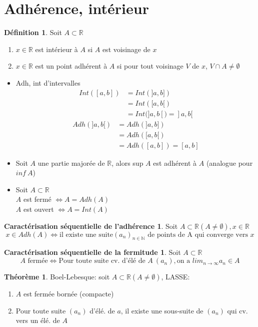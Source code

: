 \documentclass[fleqn]{article}
\theoremstyle{definition} \newtheorem*{defi}{D\'efinition}
\theoremstyle{definition} \newtheorem*{theo}{Th\'eor\`eme}
\theoremstyle{definition} \newtheorem*{adh}{Caract\'erisation s\'equentielle de l'adh\'erence}
\theoremstyle{definition} \newtheorem*{fermitude}{Caract\'erisation s\'equentielle de la fermitude}
\begin{document}
\section{Adh\'erence, int\'erieur}
\begin{defi}
	Soit $A \subset \mathbb{R}$
	\begin{enumerate}
		\item $x \in \mathbb{R}$ est int\'erieur \`a $A$ si $A$ est voisinage de $x$
		\item $x \in \mathbb{R}$ est un point adh\'erent \`a $A$ si pour tout voisinage $V$ de $x$, $V \cap A \neq \emptyset$ \\
	\end{enumerate}
\end{defi}
\begin{itemize}
	\item Adh, int d'intervalles
		\begin{align*}
			Int([a,b]) &= Int(]a,b]) \\
					   &= Int([a,b[) \\
					   &= Int(]a,b[) = ]a,b[
		\end{align*}
		\begin{align*}
			Adh(]a,b[) &= Adh(]a,b]) \\
					   &= Adh([a,b[) \\
					   &= Adh([a,b]) = [a,b]
		\end{align*}
	\item Soit $A$ une partie major\'ee de $\mathbb{R}$, alors sup $A$ est adh\'erent \`a $A$ (analogue pour $inf\ A$)
	\item Soit $A \subset \mathbb{R}$ \\
		$A$ est ferm\'e $\Leftrightarrow A = Adh(A)$ \\
		$A$ est ouvert $\Leftrightarrow A = Int(A)$
\end{itemize}
\begin{adh}
	Soit $A \subset \mathbb{R} (A \neq \emptyset), x \in \mathbb{R}$
	\[x \in Adh(A) \Leftrightarrow \text{il existe une suite} (a_n)_{n \in \mathbb{N}} \text{ de points de A qui converge vers } x\]
\end{adh}
\begin{fermitude}
	Soit $A \subset \mathbb{R}$
	\[A \text{ ferm\'ee} \Leftrightarrow \text{Pour toute suite cv. d'\'el\'e de } A\ (a_n), \text{on a } lim_{n \to \infty} a_n \in A\]
\end{fermitude}
\begin{theo}
	Boel-Lebesque: soit $A \subset \mathbb{R} (A \neq \emptyset)$, LASSE:
	\begin{enumerate}
		\item $A$ est ferm\'ee born\'ee (compacte)
		\item Pour toute suite $(a_n)$ d'\'el\'e. de $a$, il existe une sous-suite de $(a_n)$ qui cv. vers un \'el\'e. de $A$
	\end{enumerate}
\end{theo}
\end{document}

